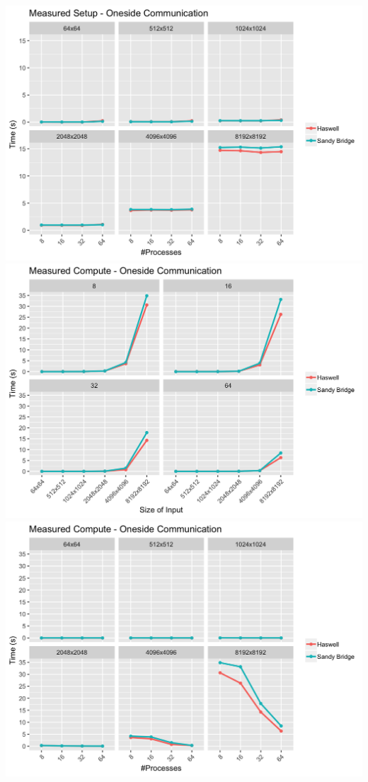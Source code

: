 \documentclass[10pt, letterpaper, twoside]{article}
\begin{document}
\begin{titlepage}
\begin{enumerate}
\includegraphics[scale = 0.18]{OS_Measured-Setup_InputSize.png}
\vspace{100mm}
\includegraphics[scale = 0.18]{OS_Measured-Compute_Processes.png}
\includegraphics[scale = 0.18]{OS_Measured-Compute_InputSize.png}

\end{enumerate}
\end{titlepage}
\end{document}

